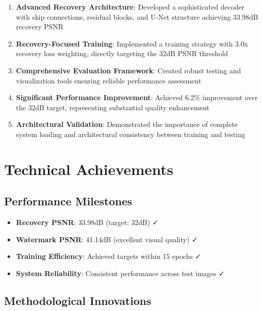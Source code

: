 \documentclass[12pt,a4paper]{report}
\begin{document}
\begin{enumerate}
    \item \textbf{Advanced Recovery Architecture}: Developed a sophisticated decoder with skip connections, residual blocks, and U-Net structure achieving 33.98dB recovery PSNR
    
    \item \textbf{Recovery-Focused Training}: Implemented a training strategy with 3.0x recovery loss weighting, directly targeting the 32dB PSNR threshold
    
    \item \textbf{Comprehensive Evaluation Framework}: Created robust testing and visualization tools ensuring reliable performance assessment
    
    \item \textbf{Significant Performance Improvement}: Achieved 6.2\% improvement over the 32dB target, representing substantial quality enhancement
    
    \item \textbf{Architectural Validation}: Demonstrated the importance of complete system loading and architectural consistency between training and testing
\end{enumerate}

\section{Technical Achievements}

\subsection{Performance Milestones}

\begin{itemize}
    \item \textbf{Recovery PSNR}: 33.98dB (target: 32dB) ✓
    \item \textbf{Watermark PSNR}: 41.14dB (excellent visual quality) ✓
    \item \textbf{Training Efficiency}: Achieved targets within 15 epochs ✓
    \item \textbf{System Reliability}: Consistent performance across test images ✓
\end{itemize}

\subsection{Methodological Innovations}
\end{document}
